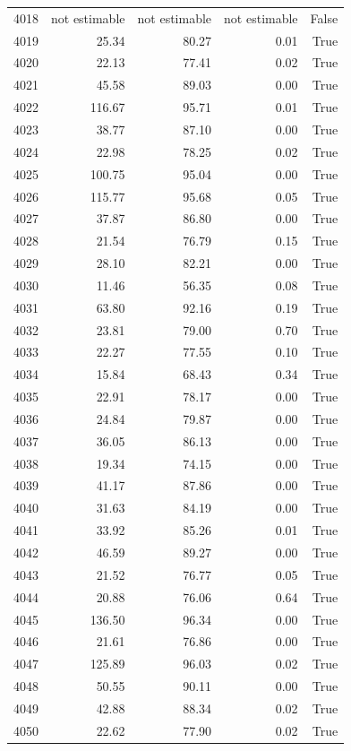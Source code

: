 \begin{longtable}{rrrrr}
4018 & not estimable & not estimable & not estimable & False \\
4019 & 25.34 & 80.27 & 0.01 & True \\
4020 & 22.13 & 77.41 & 0.02 & True \\
4021 & 45.58 & 89.03 & 0.00 & True \\
4022 & 116.67 & 95.71 & 0.01 & True \\
4023 & 38.77 & 87.10 & 0.00 & True \\
4024 & 22.98 & 78.25 & 0.02 & True \\
4025 & 100.75 & 95.04 & 0.00 & True \\
4026 & 115.77 & 95.68 & 0.05 & True \\
4027 & 37.87 & 86.80 & 0.00 & True \\
4028 & 21.54 & 76.79 & 0.15 & True \\
4029 & 28.10 & 82.21 & 0.00 & True \\
4030 & 11.46 & 56.35 & 0.08 & True \\
4031 & 63.80 & 92.16 & 0.19 & True \\
4032 & 23.81 & 79.00 & 0.70 & True \\
4033 & 22.27 & 77.55 & 0.10 & True \\
4034 & 15.84 & 68.43 & 0.34 & True \\
4035 & 22.91 & 78.17 & 0.00 & True \\
4036 & 24.84 & 79.87 & 0.00 & True \\
4037 & 36.05 & 86.13 & 0.00 & True \\
4038 & 19.34 & 74.15 & 0.00 & True \\
4039 & 41.17 & 87.86 & 0.00 & True \\
4040 & 31.63 & 84.19 & 0.00 & True \\
4041 & 33.92 & 85.26 & 0.01 & True \\
4042 & 46.59 & 89.27 & 0.00 & True \\
4043 & 21.52 & 76.77 & 0.05 & True \\
4044 & 20.88 & 76.06 & 0.64 & True \\
4045 & 136.50 & 96.34 & 0.00 & True \\
4046 & 21.61 & 76.86 & 0.00 & True \\
4047 & 125.89 & 96.03 & 0.02 & True \\
4048 & 50.55 & 90.11 & 0.00 & True \\
4049 & 42.88 & 88.34 & 0.02 & True \\
4050 & 22.62 & 77.90 & 0.02 & True \\

\end{longtable}
